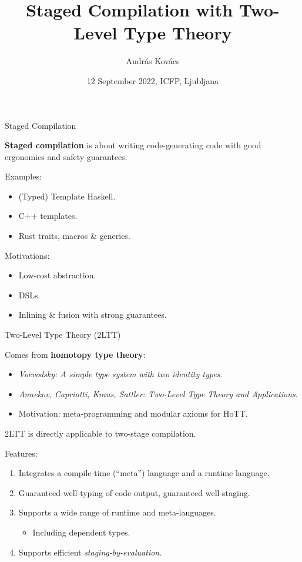 \documentclass[dvipsnames,aspectratio=169]{beamer}
\title{Staged Compilation with Two-Level Type Theory}
\author{András Kovács}
\institute{
  {Eötvös Loránd University}
}
\date{12 September 2022, ICFP, Ljubljana}
\theoremstyle{remark}
\begin{document}
\frame{\titlepage}

\begin{frame}{Staged Compilation}

\begin{block}{}
\textbf{Staged compilation} is about writing code-generating code with good ergonomics
and safety guarantees.
\end{block}
\vspace{1em}
\pause

Examples:
\begin{itemize}
  \item (Typed) Template Haskell.
  \item C++ templates.
  \item Rust traits, macros \& generics.
\end{itemize}
\vspace{1em}
\pause

Motivations:
\begin{itemize}
  \item Low-cost abstraction.
  \item DSLs.
  \item Inlining \& fusion with strong guarantees.
\end{itemize}

\end{frame}

\begin{frame}{Two-Level Type Theory (2LTT)}

Comes from \textbf{homotopy type theory}:
\begin{itemize}
  \item \emph{Voevodsky: A simple type system with two identity types}.
  \item \emph{Annekov, Capriotti, Kraus, Sattler: Two-Level Type Theory and Applications}.
  \item Motivation: meta-programming and modular axioms for HoTT.
\end{itemize}
\vspace{1em}
\pause

2LTT is directly applicable to two-stage compilation.
\vspace{1em}
\pause

Features:
\begin{enumerate}
\item Integrates a compile-time (``meta'') language and a runtime language.
\pause
\item Guaranteed well-typing of code output, guaranteed well-staging.
\pause
\item Supports a wide range of runtime and meta-languages.
  \begin{itemize}
  \pause
  \item \alert{Including dependent types}.
  \end{itemize}
\pause
\item Supports efficient \emph{staging-by-evaluation}.
\end{enumerate}
\vspace{1em}
\end{frame}
\end{document}
